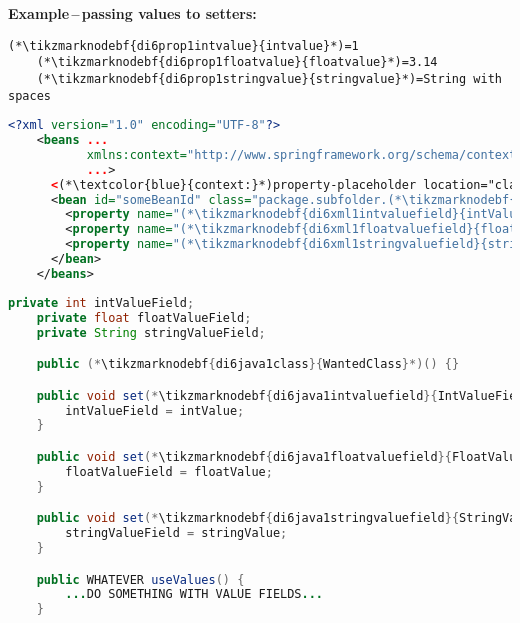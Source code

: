 \noindent \textbf{Example\,--\,passing values to setters:}
\begin{lstlisting}[title={A \textit{.properties} file called \tikzmarknodebf{di6prop1filename}{\textit{setters.properties}}}]
    (*\tikzmarknodebf{di6prop1intvalue}{intvalue}*)=1
    (*\tikzmarknodebf{di6prop1floatvalue}{floatvalue}*)=3.14
    (*\tikzmarknodebf{di6prop1stringvalue}{stringvalue}*)=String with spaces
\end{lstlisting}
\begin{lstlisting}[language=XML, title={Configuration XML}]
    <?xml version="1.0" encoding="UTF-8"?>
    <beans ...
           xmlns:context="http://www.springframework.org/schema/context"
           ...>
      <(*\textcolor{blue}{context:}*)property-placeholder location="classpath:(*\tikzmarknodebf{di6xml1filename}{setter.properties}[ForestGreen]*)"/>
      <bean id="someBeanId" class="package.subfolder.(*\tikzmarknodebf{di6xml1class}{WantedClass}[ForestGreen]*)">
        <property name="(*\tikzmarknodebf{di6xml1intvaluefield}{intValueField}[ForestGreen]*)" value="(*\textcolor{ForestGreen}{\$\{}\tikzmarknodebf{di6xml1intvalue}{intvalue}[ForestGreen]\textcolor{ForestGreen}{\}}*)"/>
        <property name="(*\tikzmarknodebf{di6xml1floatvaluefield}{floatValueField}[ForestGreen]*)" value="(*\textcolor{ForestGreen}{\$\{}\tikzmarknodebf{di6xml1floatvalue}{floatvalue}[ForestGreen]\textcolor{ForestGreen}{\}}*)"/>
        <property name="(*\tikzmarknodebf{di6xml1stringvaluefield}{stringValueField}[ForestGreen]*)" value="(*\textcolor{ForestGreen}{\$\{}\tikzmarknodebf{di6xml1stringvalue}{stringvalue}[ForestGreen]\textcolor{ForestGreen}{\}}*)"/>
      </bean>
    </beans>
\end{lstlisting}
\begin{lstlisting}[language=Java, title={Wanted class with the zero--parameter constructor and setter methods}]
    private int intValueField;
    private float floatValueField;
    private String stringValueField;

    public (*\tikzmarknodebf{di6java1class}{WantedClass}*)() {}

    public void set(*\tikzmarknodebf{di6java1intvaluefield}{IntValueField}*)(int intValue) {
        intValueField = intValue;
    }

    public void set(*\tikzmarknodebf{di6java1floatvaluefield}{FloatValueField}*)(float floatValue) {
        floatValueField = floatValue;
    }

    public void set(*\tikzmarknodebf{di6java1stringvaluefield}{StringValueField}*)(string stringValue) {
        stringValueField = stringValue;
    }

    public WHATEVER useValues() {
        ...DO SOMETHING WITH VALUE FIELDS...
    }
\end{lstlisting}
